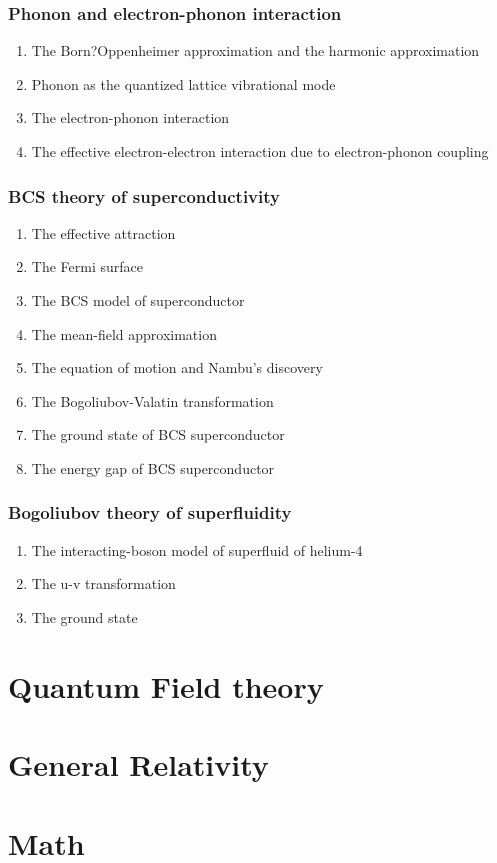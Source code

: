 \documentclass[12pt]{article}
\numberwithin{equation}{section}
\begin{document}
\subsubsection{Phonon and electron-phonon interaction}
\begin{enumerate}
\item The Born?Oppenheimer approximation and the harmonic approximation
\item Phonon as the quantized lattice vibrational mode
\item The electron-phonon interaction
\item The effective electron-electron interaction due to electron-phonon coupling
\end{enumerate}
\subsubsection{BCS theory of superconductivity}
\begin{enumerate}
\item The effective attraction
\item The Fermi surface
\item The BCS model of  superconductor
\item The mean-field approximation
\item The equation of motion and Nambu's discovery
\item The Bogoliubov-Valatin transformation
\item The ground state of BCS superconductor
\item The energy gap of BCS superconductor
\end{enumerate}
\subsubsection{Bogoliubov theory of superfluidity}
\begin{enumerate}
\item The interacting-boson model of superfluid of helium-4
\item The u-v transformation
\item The ground state
\end{enumerate}                     
\section{Quantum Field theory}

\section{General Relativity}

\section{Math}

\renewcommand\refname{Reference}



  \clearpage
\end{document}

